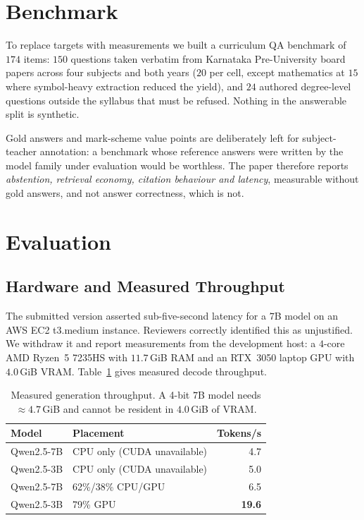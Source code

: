 \documentclass[conference]{IEEEtran}
\begin{document}
\section{Benchmark}
To replace targets with measurements we built a curriculum QA benchmark of
$174$ items: $150$ questions taken verbatim from Karnataka Pre-University board
papers across four subjects and both years ($20$ per cell, except mathematics
at $15$ where symbol-heavy extraction reduced the yield), and $24$ authored
degree-level questions outside the syllabus that must be refused. Nothing in
the answerable split is synthetic.

Gold answers and mark-scheme value points are deliberately left for
subject-teacher annotation: a benchmark whose reference answers were written by
the model family under evaluation would be worthless. The paper therefore
reports \emph{abstention, retrieval economy, citation behaviour and latency},
measurable without gold answers, and not answer correctness, which is not.

\section{Evaluation}
\subsection{Hardware and Measured Throughput}
\label{sec:latency}
The submitted version asserted sub-five-second latency for a $7$B model on an
AWS EC2 t3.medium instance. Reviewers correctly identified this as unjustified.
We withdraw it and report measurements from the development host: a $4$-core
AMD Ryzen~5 7235HS with $11.7$\,GiB RAM and an RTX~3050 laptop GPU with
$4.0$\,GiB VRAM. Table~\ref{tab:throughput} gives measured decode throughput.

\begin{table}[htbp]
\caption{Measured generation throughput. A 4-bit $7$B model needs
$\approx 4.7$\,GiB and cannot be resident in $4.0$\,GiB of VRAM.}
\label{tab:throughput}
\centering
\begin{tabular}{llr}
\toprule
\textbf{Model} & \textbf{Placement} & \textbf{Tokens/s} \\
\midrule
Qwen2.5-7B & CPU only (CUDA unavailable) & 4.7 \\
Qwen2.5-3B & CPU only (CUDA unavailable) & 5.0 \\
Qwen2.5-7B & 62\%/38\% CPU/GPU & 6.5 \\
Qwen2.5-3B & 79\% GPU & \textbf{19.6} \\
\bottomrule
\end{tabular}
\end{table}
\end{document}
